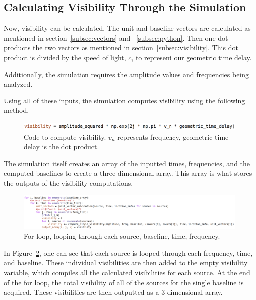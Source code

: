 \documentclass[12pt]{article}
\begin{document}
\subsection{Calculating Visibility Through the Simulation}
Now, visibility can be calculated. The unit and baseline vectors are calculated as mentioned in section~\ref{subsec:vectors} and ~\ref{subsec:python}. Then one dot products the two vectors as mentioned in section~\ref{subsec:visibility}. This dot product is divided by the speed of light, $c$, to represent our geometric time delay. 

Additionally, the simulation requires the amplitude values and frequencies being analyzed.

Using all of these inputs, the simulation computes visibility using the following method.
\begin{figure}[H]
    \centering
    \includegraphics[width=0.8\linewidth]{visibility_equation.png}
    \caption{Code to compute visibility. $v_n$ represents frequency, geometric time delay is the dot product.}
    \label{fig:visibility_code}
\end{figure}

The simulation itself creates an array of the inputted times, frequencies, and the computed baselines to create a three-dimensional array. This array is what stores the outputs of the visibility computations. 

\begin{figure}[h]
    \centering
    \includegraphics[width=0.8\linewidth]{updated_for_loop.png}
    \caption{For loop, looping through each source, baseline, time, frequency.}
    \label{fig:updated_for_loop}
\end{figure}

In Figure~\ref{fig:updated_for_loop}, one can see that each source is looped through each frequency, time, and baseline. These individual visibilities are then added to the empty visibility variable, which compiles all the calculated visibilities for each source. At the end of the for loop, the total visibility of all of the sources for the single baseline is acquired. These visibilities are then outputted as a 3-dimensional array. 
\end{document}
